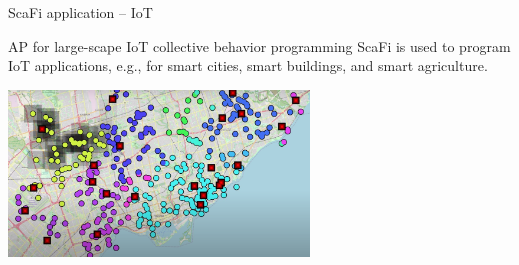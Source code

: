 \documentclass[presentation, 9pt]{beamer}\mode<presentation>{\usetheme{AMSBolognaFC}}
\begin{document}
\begin{frame}{ScaFi application -- IoT}
	\begin{exampleblock}{AP for large-scape IoT collective behavior programming}
		ScaFi is used to program IoT applications, e.g., for smart cities, smart buildings, and smart agriculture.
	\end{exampleblock}

	\centering
	\includegraphics[width=0.6\textwidth]{img/iee-floodwatch.png}
\end{frame}
\end{document}
